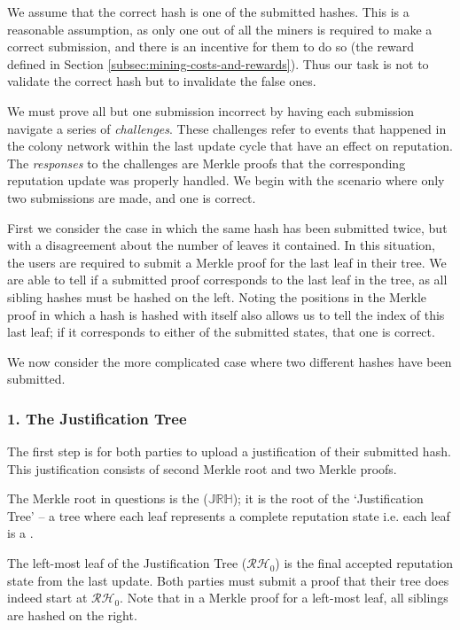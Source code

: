 We assume that the correct hash is one of the  submitted hashes. This is a reasonable assumption, as only one out of all the miners is required to make a correct submission, and there is an incentive for them to do so (the reward defined in Section \ref{subsec:mining-costs-and-rewards}). Thus our task is not to validate the correct hash but to invalidate the false ones.

We must prove all but one submission incorrect by having each submission navigate a series of \emph{challenges}. These challenges refer to events that happened in the colony network within the last update cycle that have an effect on reputation. The \emph{responses} to the challenges are Merkle proofs that the corresponding reputation update was properly handled. We begin with the scenario where only two submissions are made, and one is correct. 

First we consider the case in which the same hash has been submitted twice, but with a disagreement about the number of leaves it contained. In this situation, the users are required to submit a Merkle proof for the last leaf in their tree. We are able to tell if a submitted proof corresponds to the last leaf in the tree, as all sibling hashes must be hashed on the left. Noting the positions in the Merkle proof in which a hash is hashed with itself also allows us to tell the index of this last leaf; if it corresponds to either of the submitted states, that one is correct.

We now consider the more complicated case where two different hashes have been submitted.

\subsubsection*{1. The Justification Tree}
  \newcommand{\jrh}{\ensuremath{\mathbb{JRH}}}
The first step is for both parties to upload a justification of their submitted hash. This justification consists of second Merkle root and two Merkle proofs.

The Merkle root in questions is the  (\jrh); it is the root of the `Justification Tree' -- a tree where each leaf represents a complete reputation state i.e. each leaf is a . 

The left-most leaf of the Justification Tree ($\mathcal{RH}_0$) is the final accepted reputation state from the last update. Both parties must submit a proof that their tree does indeed start at $\mathcal{RH}_0$. Note that in a Merkle proof for a left-most leaf, all siblings are hashed on the right.

